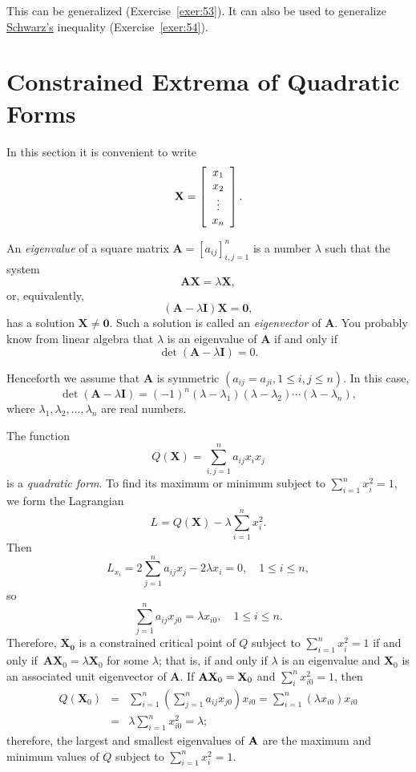 \documentclass{article}
\newcommand{\dst}{\displaystyle}
\begin{document}
This  can be generalized (Exercise~\ref{exer:53}).
  It can also be used to
generalize
\href{http://www-history.mcs.st-and.ac.uk/Mathematicians/Schwarz.html}
{Schwarz's}
 inequality
(Exercise~\ref{exer:54}).

\section{Constrained Extrema of Quadratic Forms} \label{section:4}

In this section it is convenient to write
$$
{\bf X}=
\left[\begin{array}{ccccccc}
x_{1}\\x_{2}\\\vdots\\x_{n}
\end{array}\right].
$$

An {\it eigenvalue} of a square matrix $\mathbf{A} = [a_{ij}]_{i,j=1}^{n}$
is a number $\lambda$ such that the system
$$
\mathbf{A}\mathbf{X} = \lambda \mathbf{X},
$$
or, equivalently,
$$
(\mathbf{A}-\lambda \mathbf{I})\mathbf{X}=\mathbf{0},
$$
has a solution $\mathbf{X} \ne \mathbf{0}$. Such a solution is called
an {\it eigenvector} of $\mathbf{A}$. You probably know from
linear algebra  that
$\lambda$ is an eigenvalue of $\mathbf{A}$ if and only if
$$
\det(\mathbf{A} -\lambda \mathbf{I}) = {0}.
 $$

Henceforth we assume that
$\mathbf{A}$ is symmetric $(a_{ij} = a_{ji}, 1 \le i, j \le n)$. In this
case,
$$
\det(\mathbf{A}-\lambda \mathbf{I}) =
(-1)^{n}(\lambda-\lambda_{1})(\lambda-\lambda_2) \cdots
(\lambda-\lambda_{n}),
$$
where $\lambda_{1},\lambda_2,\dots,\lambda_{n}$ are real numbers.

The function
$$
Q(\mathbf{X}) = \sum^{n}_{i,j=1} a_{ij} x_{i}x_{j}
$$
is a \emph{quadratic form}.
To find its maximum or minimum
subject to
$\dst{\sum^{n}_{i=1} x^{2}_{i}=1}$,
we form the Lagrangian
$$
L=Q(\mathbf{X}) - \lambda \sum^{n}_{i=1}x^{2}_{i}.
$$
Then
$$
L_{x_{i}}= 2 \sum^{n}_{j=1} a_{ij}x_{j} - 2\lambda x_{i}=0,
\quad 1 \le i \le n,
$$
so
$$
\sum_{j=1}^{n}a_{ij}x_{j0}=\lambda x_{i0},\quad  1\le i\le n.
$$
Therefore,  $\mathbf{X_{0}}$ is a constrained critical
point of $Q$ subject to $\dst{\sum^{n}_{i=1} x^{2}_{i}=1}$ if and only if\,
${\mathbf A}{\mathbf X}_{0}=\lambda{\mathbf X}_{0}$ for some $\lambda$;
that
is, if and only if $\lambda$ is an eigenvalue and $\mathbf{X}_{0}$ is an
associated unit eigenvector of $\mathbf{A}$. If ${\mathbf
A}\mathbf{X}_{0}={\bf X}_{0}$ and
$\dst{\sum_{i}^{n}x_{i0}^{2}}=1$, then
\begin{eqnarray*}
Q(\mathbf{X}_{0}) & =& \sum^{n}_{i=1} \left(\sum^{n}_{j=1} a_{ij}x_{j0}
\right) x_{i0} =
\sum^{n}_{i=1} (\lambda x_{i0})x_{i0} \\
& =& \lambda \sum^{n}_{i=1} x^{2}_{i0} = \lambda;
\end{eqnarray*}
therefore, the largest and smallest eigenvalues of ${\bf A}$ are the
maximum
and minimum values of $Q$ subject to $\dst{\sum_{i=1}^{n}x_{i}^{2}}=1$.
\end{document}
